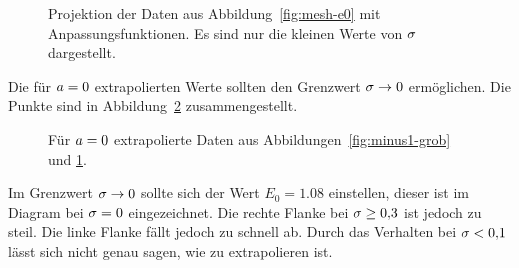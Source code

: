 \begin{figure}[htbp]
    \caption{%
        Projektion der Daten aus Abbildung~\ref{fig:mesh-e0} mit
        Anpassungsfunktionen. Es sind nur die kleinen Werte von $\sigma$
        dargestellt.
    }
    \label{fig:minus1-fein}
\end{figure}

Die für $a = 0$ extrapolierten Werte sollten den Grenzwert
$\sigma \to 0$ ermöglichen. Die Punkte sind in
Abbildung~\ref{fig:minus1-meta} zusammengestellt.

\begin{figure}[htbp]
    \centering
    \caption{%
        Für $a = 0$ extrapolierte Daten aus
        Abbildungen~\ref{fig:minus1-grob} und \ref{fig:minus1-fein}.
    }
    \label{fig:minus1-meta}
\end{figure}

Im Grenzwert $\sigma \to 0$ sollte sich der Wert $E_0 = \num{1.08}$
einstellen, dieser ist im Diagram bei $\sigma = 0$ eingezeichnet. Die
rechte Flanke bei $\sigma \geq \num{0.3}$ ist jedoch zu steil. Die linke
Flanke fällt jedoch zu schnell ab. Durch das Verhalten bei $\sigma <
\num{0.1}$ lässt sich nicht genau sagen, wie zu extrapolieren ist.


